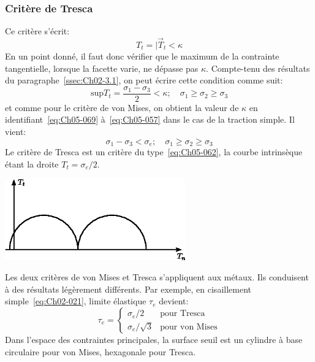 \subsubsection{Critère de Tresca}
Ce critère s'écrit:
\begin{equation}
    T_t = |\vec{T}_t < \kappa
    \label{eq:Ch05-068}
\end{equation}
En un point donné, il faut donc vérifier que le maximum de la contrainte tangentielle, lorsque la facette varie, ne dépasse pas $\kappa$. 
Compte-tenu des résultats du paragraphe~\ref{ssec:Ch02-3.1}, on peut écrire cette condition comme suit:
\begin{equation}
    \mathrm{sup} T_t = \frac{\sigma_1 - \sigma_3}{2} < \kappa; \quad \sigma_1 \geq \sigma_2 \geq \sigma_3
    \label{eq:Ch05-069}
\end{equation}
et comme pour le critère de von Mises, on obtient la valeur de $\kappa$ en identifiant~\eqref{eq:Ch05-069} à~\eqref{eq:Ch05-057} dans le cas de la traction simple.
Il vient: 
\begin{equation}
    \sigma_1 - \sigma_3 < \sigma_e; \quad \sigma_1 \geq \sigma_2 \geq \sigma_3
    \label{eq:Ch05-070}
\end{equation}
Le critère de Tresca est un critère du type~\eqref{eq:Ch05-062}, la courbe intrinsèque étant la droite $T_t = \sigma_e/2$. 
\begin{center}
    \includegraphics[height=3.5cm]{../images/T1_Ch05-05}
\end{center}
Les deux critères de von Mises et Tresca s'appliquent aux métaux.
Ils conduisent à des résultats légèrement différents.
Par exemple, en cisaillement simple~\eqref{eq:Ch02-021}, limite élastique $\tau_e$ devient:
\begin{equation}
    \tau_e = 
    \begin{cases}
        \sigma_e /2 & \text{pour Tresca} \\
        \sigma_e /\sqrt{3} & \text{pour von Mises}
    \end{cases}
    \label{eq:Ch05-071}
\end{equation}
Dans l'espace des contraintes principales, la surface seuil est un cylindre à base circulaire pour von Mises, hexagonale pour Tresca.
